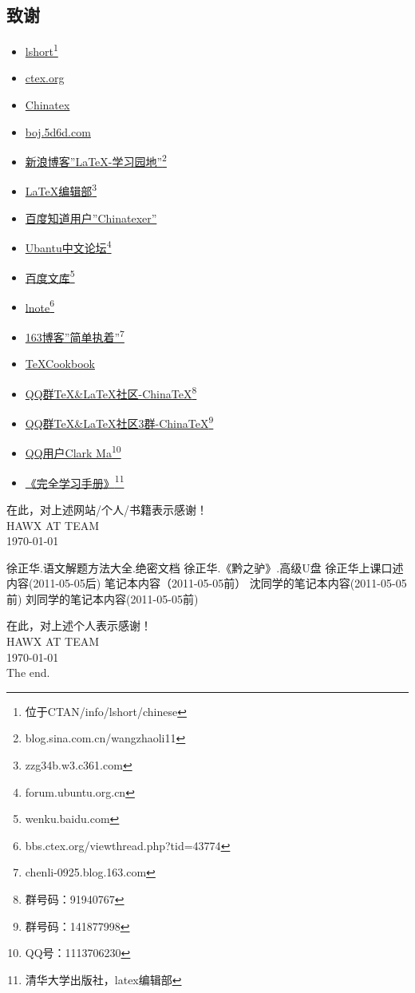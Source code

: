 \subsection{致谢}\label{thanks}
\begin{itemize}
\item \underline{lshort}\footnote{位于CTAN/info/lshort/chinese}
\item \underline{ctex.org}
\item \underline{Chinatex}
\item \underline{boj.5d6d.com}
\item \underline{新浪博客''LaTeX-学习园地''}\footnote{blog.sina.com.cn/wangzhaoli11}
\item \underline{LaTeX编辑部}\footnote{zzg34b.w3.c361.com}
\item \underline{百度知道用户''Chinatexer''}
\item \underline{Ubantu中文论坛}\footnote{forum.ubuntu.org.cn}
\item \underline{百度文库}\footnote{wenku.baidu.com}
\item \underline{lnote}\footnote{bbs.ctex.org/viewthread.php?tid=43774}
\item \underline{163博客''简单执着''}\footnote{chenli-0925.blog.163.com}
\item \underline{\TeX Cookbook}
\item \underline{QQ群TeX\&LaTeX社区-ChinaTeX}\footnote{群号码：91940767}
\item \underline{QQ群TeX\&LaTeX社区3群-ChinaTeX}\footnote{群号码：141877998}
\item \underline{QQ用户Clark Ma}\footnote{QQ号：1113706230}
\item \underline{《\LaTeXe 完全学习手册》}\footnote{清华大学出版社，latex编辑部}
\end{itemize}
在此，对上述网站/个人/书籍表示感谢！\\
HAWX AT TEAM\\
\today\\ %
\newpage
\begin{thebibliography}{99}
徐正华.语文解题方法大全.绝密文档
徐正华.《黔之驴》.高级U盘
徐正华上课口述内容(2011-05-05后)
笔记本内容（2011-05-05前）
沈同学的笔记本内容(2011-05-05前)
刘同学的笔记本内容(2011-05-05前)
\end{thebibliography}
在此，对上述个人表示感谢！\\
HAWX AT TEAM\\
\today\\
The end. \label{appendix} 